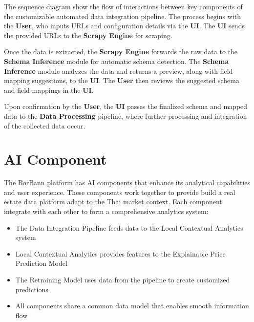 The sequence diagram show the flow of interactions between key components of the customizable automated data integration pipeline. The process begins with the \textbf{User}, who inputs URLs and configuration details via the \textbf{UI}. The \textbf{UI} sends the provided URLs to the \textbf{Scrapy Engine} for scraping.

Once the data is extracted, the \textbf{Scrapy Engine} forwards the raw data to the \textbf{Schema Inference} module for automatic schema detection. The \textbf{Schema Inference} module analyzes the data and returns a preview, along with field mapping suggestions, to the \textbf{UI}. The \textbf{User} then reviews the suggested schema and field mappings in the \textbf{UI}.

Upon confirmation by the \textbf{User}, the \textbf{UI} passes the finalized schema and mapped data to the \textbf{Data Processing} pipeline, where further processing and integration of the collected data occur.



\section{AI Component}

The BorBann platform has AI components that enhance its analytical capabilities and user experience. These components work together to provide build a real estate data platform adapt to the Thai market context.
Each component integrate with each other to form a comprehensive analytics system:

\begin{itemize}
    \item The Data Integration Pipeline feeds data to the Local Contextual Analytics system
    \item Local Contextual Analytics provides features to the Explainable Price Prediction Model
    \item The Retraining Model uses data from the pipeline to create customized predictions
    \item All components share a common data model that enables smooth information flow
\end{itemize}

